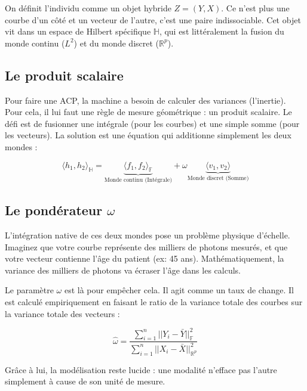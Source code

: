 \documentclass[11pt, a4paper]{article}
\begin{document}
On définit l'individu comme un objet hybride $Z = (Y, X)$. Ce n'est plus une courbe d'un côté et un vecteur de l'autre, c'est une paire indissociable. Cet objet vit dans un espace de Hilbert spécifique $\mathbb{H}$, qui est littéralement la fusion du monde continu ($L^2$) et du monde discret ($\mathbb{R}^p$).

\subsection{Le produit scalaire}
Pour faire une ACP, la machine a besoin de calculer des variances (l'inertie). Pour cela, il lui faut une règle de mesure géométrique : un produit scalaire.
Le défi est de fusionner une intégrale (pour les courbes) et une simple somme (pour les vecteurs). La solution est une équation qui additionne simplement les deux mondes :

\begin{equation}
\langle h_1, h_2 \rangle_{\mathbb{H}} = \underbrace{\langle f_1, f_2 \rangle_{\mathbb{F}}}_{\text{Monde continu (Intégrale)}} + \omega \underbrace{\langle v_1, v_2 \rangle}_{\text{Monde discret (Somme)}}
\end{equation}

\subsection{Le pondérateur $\omega$}
L'intégration native de ces deux mondes pose un problème physique d'échelle. Imaginez que votre courbe représente des milliers de photons mesurés, et que votre vecteur contienne l'âge du patient (ex: 45 ans). Mathématiquement, la variance des milliers de photons va écraser l'âge dans les calculs.

Le paramètre $\omega$ est là pour empêcher cela. Il agit comme un taux de change. Il est calculé empiriquement en faisant le ratio de la variance totale des courbes sur la variance totale des vecteurs :

\begin{equation}
\hat{\omega} = \frac{\sum_{i=1}^n ||Y_i - \bar{Y}||_{\mathbb{F}}^2}{\sum_{i=1}^n ||X_i - \bar{X}||_{\mathbb{R}^p}^2}
\end{equation}

Grâce à lui, la modélisation reste lucide : une modalité n'efface pas l'autre simplement à cause de son unité de mesure.
\end{document}
